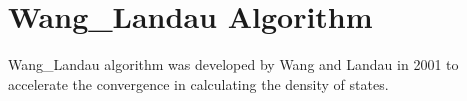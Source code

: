 \section{Wang_Landau Algorithm\label{Sec:ES:Wang_Landau}}
Wang_Landau algorithm was developed by Wang and Landau in 2001 to accelerate the convergence in calculating the density of states.
